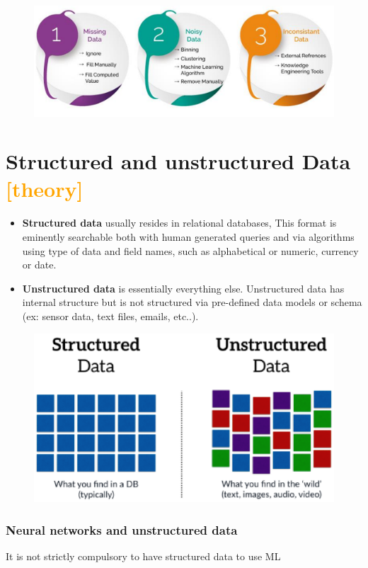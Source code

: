 \begin{figure}[H]
    \centering
    \includegraphics[width=0.8\linewidth]{07-08/images/data missing.png}
\end{figure}

\section{Structured and unstructured Data \textcolor{orange}{[theory]}}

\begin{itemize}
    \item \textbf{Structured data} usually resides in relational databases, This format is eminently searchable both with human generated queries and via algorithms using type of data and field names, such as alphabetical or numeric, currency or date.
    \item \textbf{Unstructured data} is essentially everything else. Unstructured data has internal structure but is not structured via pre-defined data models or schema (ex: sensor data, text files, emails, etc..).
\end{itemize}

\begin{figure}[H]
    \centering
    \includegraphics[width=0.7\linewidth]{07-08/images/struct-vs-unstruct.png}
\end{figure}

\subsubsection{Neural networks and unstructured data}
\noindent It is not strictly compulsory to have structured data to use ML 

